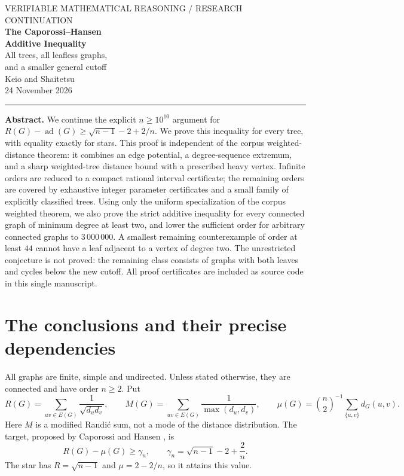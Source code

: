 \documentclass[11pt,a4paper]{article}
\theoremstyle{remark}
\DeclareMathOperator{\ad}{ad}
\numberwithin{equation}{section}
\begin{document}
\begin{center}
{\small\color{quiet}VERIFIABLE MATHEMATICAL REASONING / RESEARCH CONTINUATION}\\[9pt]
{\LARGE\bfseries\color{ink}The Caporossi--Hansen\\[3pt] Additive Inequality}\\[8pt]
{\Large All trees, all leafless graphs,\\[3pt]
and a smaller general cutoff}\\[10pt]
{\large Keio and Shaitetsu}\\[4pt]
24 November 2026
\end{center}
\vspace{3pt}\hrule\vspace{9pt}

\textbf{Abstract.}
We continue the explicit $n\ge10^{10}$ argument for
$R(G)-\ad(G)\ge\sqrt{n-1}-2+2/n$. We prove this inequality for every
tree, with equality exactly for stars. This proof is independent of the
corpus weighted-distance theorem: it combines an edge potential, a
degree-sequence extremum, and a sharp weighted-tree distance bound with
a prescribed heavy vertex. Infinite orders are reduced to a compact
rational interval certificate; the remaining orders are covered by
exhaustive integer parameter certificates and a small family of explicitly
classified trees.
Using only the uniform specialization of the corpus weighted theorem,
we also prove the strict additive inequality for every connected graph
of minimum degree at least two, and lower the sufficient order for
arbitrary connected graphs to $3\,000\,000$.
A smallest remaining counterexample of order at least $44$ cannot have
a leaf adjacent to a vertex of degree two.
The unrestricted conjecture is not proved: the remaining class consists
of graphs with both leaves and cycles below the new cutoff.
All proof certificates are included as source code in this single
manuscript.

\section{The conclusions and their precise dependencies}

All graphs are finite, simple and undirected. Unless stated otherwise,
they are connected and have order $n\ge2$. Put
\[
 R(G)=\sum_{uv\in E(G)}\frac1{\sqrt{d_ud_v}},\qquad
 M(G)=\sum_{uv\in E(G)}\frac1{\max(d_u,d_v)},\qquad
 \mu(G)=\binom n2^{-1}\sum_{\{u,v\}}d_G(u,v).
\]
Here $M$ is a modified Randi\'c sum, not a mode of the distance distribution.
The target, proposed by Caporossi and Hansen \cite{cap,favaron}, is
\[
 R(G)-\mu(G)\ge\gamma_n,\qquad
 \gamma_n=\sqrt{n-1}-2+\frac2n.
 \tag{CH}\label{eq:CH}
\]
The star has $R=\sqrt{n-1}$ and $\mu=2-2/n$, so it attains this value.
\end{document}
